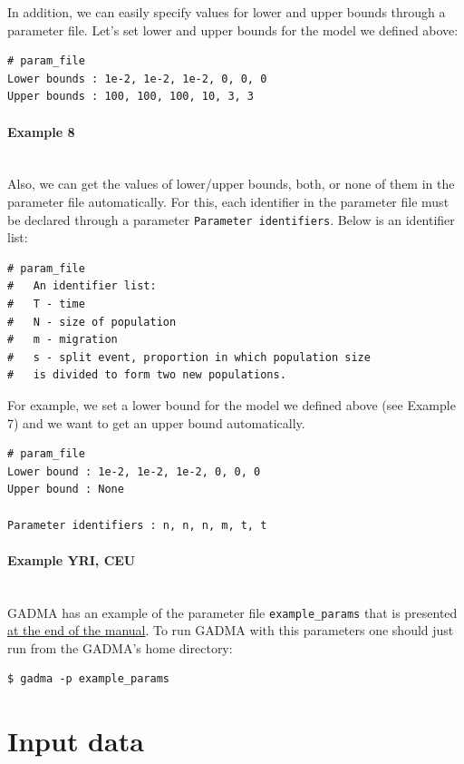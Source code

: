 \documentclass[12pt]{article}
\makeatletter
\newcommand{\py}[1]{\lstinline[language=Python, showstringspaces=False]@#1@}
\makeatother
\begin{document}
In addition, we can easily specify values for lower and upper bounds through a parameter file. Let's set lower and upper bounds for the model we defined above:

\begin{lstlisting}
# param_file
Lower bounds : 1e-2, 1e-2, 1e-2, 0, 0, 0
Upper bounds : 100, 100, 100, 10, 3, 3
\end{lstlisting}

\paragraph{Example 8}\mbox{}\\
Also, we can get the values of lower/upper bounds, both, or none of them in the parameter file automatically. For this, each identifier in the parameter file must be declared through a parameter \py{Parameter identifiers}. Below is an identifier list:

\begin{lstlisting}
# param_file
#   An identifier list:
#   T - time
#   N - size of population
#   m - migration
#   s - split event, proportion in which population size
#   is divided to form two new populations.
\end{lstlisting}

For example, we set a lower bound for the model we defined above (see Example 7) and we want to get an upper bound automatically.

\begin{lstlisting}
# param_file
Lower bound : 1e-2, 1e-2, 1e-2, 0, 0, 0
Upper bound : None

Parameter identifiers : n, n, n, m, t, t
\end{lstlisting}

\paragraph{Example YRI, CEU}\mbox{}\\
GADMA has an example of the parameter file \py{example_params} that is presented \hyperref[sec:example-params]{at the end of the manual}. To run GADMA with this parameters one should just run from the GADMA's home directory:
\begin{lstlisting}
$ gadma -p example_params
\end{lstlisting}


\section{Input data}
\end{document}
